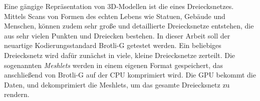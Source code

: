 Eine gängige Repräsentation von 3D-Modellen ist die eines Dreiecksnetzes.
Mittels Scans von Formen des echten Lebens wie Statuen, Gebäude und Menschen, können zudem sehr große und detaillierte Dreiecksnetze entstehen, die aus sehr vielen Punkten und Dreiecken bestehen.
In dieser Arbeit soll der neuartige Kodierungsstandard Brotli-G getestet werden.
Ein beliebiges Dreiecksnetz wird dafür zunächst in viele, kleine Dreiecksnetze zerteilt.
Die sogenannten \textit{Meshlets} werden in einem eigenen Format gespeichert, das anschließend von Brotli-G auf der CPU komprimiert wird.
Die GPU bekommt die Daten, und dekomprimiert die Meshlets, um das gesamte Dreiecksnetz zu rendern.
